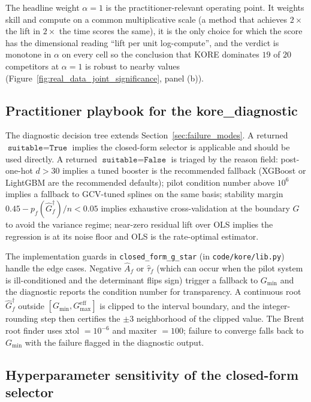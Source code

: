 \documentclass{article}
\newcommand{\KORE}{\textsc{KORE}}
\begin{document}
The headline weight $\alpha = 1$ is the practitioner-relevant operating point. It weights skill and compute on a common multiplicative scale (a method that achieves $2\times$ the lift in $2\times$ the time scores the same), it is the only choice for which the score has the dimensional reading ``lift per unit log-compute'', and the verdict is monotone in $\alpha$ on every cell so the conclusion that \KORE{} dominates $19$ of $20$ competitors at $\alpha = 1$ is robust to nearby values (Figure~\ref{fig:real_data_joint_significance}, panel (b)).

\subsection{Practitioner playbook for the kore\_diagnostic}
\label{sec:app_diagnostic_playbook}

The diagnostic decision tree extends Section~\ref{sec:failure_modes}. A returned $\texttt{suitable} = \texttt{True}$ implies the closed-form selector is applicable and should be used directly. A returned $\texttt{suitable} = \texttt{False}$ is triaged by the reason field: post-one-hot $d > 30$ implies a tuned booster is the recommended fallback (XGBoost or LightGBM are the recommended defaults); pilot condition number above $10^6$ implies a fallback to GCV-tuned splines on the same basis; stability margin $0.45 - p_f(\widehat G_f^\dagger)/n < 0.05$ implies exhaustive cross-validation at the boundary $G$ to avoid the variance regime; near-zero residual lift over OLS implies the regression is at its noise floor and OLS is the rate-optimal estimator.

The implementation guards in \texttt{closed\_form\_g\_star} (in \texttt{code/kore/lib.py}) handle the edge cases. Negative $\widehat A_f$ or $\widehat \tau_f$ (which can occur when the pilot system is ill-conditioned and the determinant flips sign) trigger a fallback to $G_{\min}$ and the diagnostic reports the condition number for transparency. A continuous root $\widehat G_f^\dagger$ outside $[G_{\min}, G_{\max}^{\mathrm{eff}}]$ is clipped to the interval boundary, and the integer-rounding step then certifies the $\pm 3$ neighborhood of the clipped value. The Brent root finder uses xtol $= 10^{-6}$ and maxiter $= 100$; failure to converge falls back to $G_{\min}$ with the failure flagged in the diagnostic output.

\subsection{Hyperparameter sensitivity of the closed-form selector}
\label{sec:app_hyperparam_sensitivity}
\end{document}
